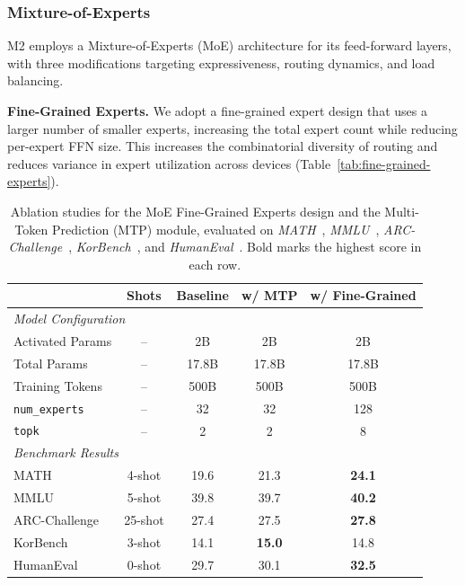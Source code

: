 \subsubsection{Mixture-of-Experts}
\label{sec:moe}

M2 employs a Mixture-of-Experts (MoE) architecture for its feed-forward layers, with three modifications targeting expressiveness, routing dynamics, and load balancing.

\noindent \textbf{Fine-Grained Experts.} We adopt a fine-grained expert design that uses a larger number of smaller experts, increasing the total expert count while reducing per-expert FFN size. This increases the combinatorial diversity of routing and reduces variance in expert utilization across devices (Table~\ref{tab:fine-grained-experts}).

\begin{table}[h]
\centering
\caption{Ablation studies for the MoE Fine-Grained Experts design and the Multi-Token Prediction (MTP) module, evaluated on \emph{MATH}~\citep{hendrycks2021math}, \emph{MMLU}~\citep{hendrycks2021mmlu}, \emph{ARC-Challenge}~\citep{clark2018arc}, \emph{KorBench}~\citep{ma2025korbenchbenchmarkinglanguagemodels}, and \emph{HumanEval}~\citep{chen2021humaneval}. Bold marks the highest score in each row.}
\label{tab:fine-grained-experts}
\label{tab:mtp-ablation}
\begin{tabular}{lcccc}
\toprule
& \textbf{Shots} & \textbf{Baseline} & \textbf{w/ MTP} & \textbf{w/ Fine-Grained} \\
\midrule
\multicolumn{5}{l}{\textit{Model Configuration}} \\
Activated Params & -- & 2B & 2B & 2B \\
Total Params & -- & 17.8B & 17.8B & 17.8B \\
Training Tokens & -- & 500B & 500B & 500B \\
\texttt{num\_experts} & -- & 32 & 32 & 128 \\
\texttt{topk} & -- & 2 & 2 & 8 \\
\midrule
\multicolumn{5}{l}{\textit{Benchmark Results}} \\
MATH & 4-shot & 19.6 & 21.3 & \textbf{24.1} \\
MMLU & 5-shot & 39.8 & 39.7 & \textbf{40.2} \\
ARC-Challenge & 25-shot & 27.4 & 27.5 & \textbf{27.8} \\
KorBench & 3-shot & 14.1 & \textbf{15.0} & 14.8 \\
HumanEval & 0-shot & 29.7 & 30.1 & \textbf{32.5} \\
\bottomrule
\end{tabular}
\end{table}

